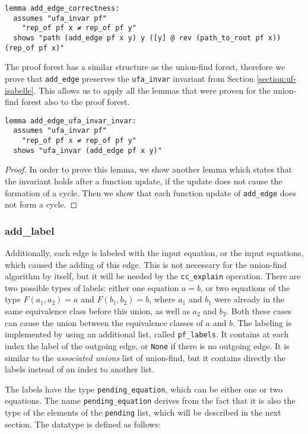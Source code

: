\begin{lstlisting}
lemma add_edge_correctness:
  assumes "ufa_invar pf"
    "rep_of pf x ≠ rep_of pf y"
  shows "path (add_edge pf x y) y ([y] @ rev (path_to_root pf x)) (rep_of pf x)"
\end{lstlisting}

The proof forest has a similar structure as the union-find forest, therefore we prove that \lstinline|add_edge| preserves the \lstinline|ufa_invar| invariant from Section \ref{section:uf-isabelle}. This allows us to apply all the lemmas that were proven for the union-find forest also to the proof forest.

\begin{lstlisting}
lemma add_edge_ufa_invar_invar:
  assumes "ufa_invar pf"
    "rep_of pf x ≠ rep_of pf y"
  shows "ufa_invar (add_edge pf x y)"
\end{lstlisting}

\begin{proof}
In order to prove this lemma, we show another lemma which states that the invariant holds after a function update, if the update does not cause the formation of a cycle. Then we show that each function update of \lstinline|add_edge| does not form a cycle.
\end{proof}

\subsubsection{add\_label}
\label{subsubsection:addlabel}

Additionally, each edge is labeled with the input equation, or the input equations, which caused the adding of this edge. This is not necessary for the union-find algorithm by itself, but it will be needed by the \lstinline|cc_explain| operation.
There are two possible types of labels: either one equation $a = b$, or two equations of the type $F(a_1, a_2) = a$ and $F(b_1, b_2) = b$, where $a_1$ and $b_1$ were already in the same equivalence class before this union, as well as $a_2$ and $b_2$.
Both these cases can cause the union between the equivalence classes of $a$ and $b$.
The labeling is implemented by using an additional list, called \lstinline|pf_labels|.
It contains at each index the label of the outgoing edge, or \lstinline|None| if there is no outgoing edge.
It is similar to the \emph{associated unions} list of union-find, but it contains directly the labels instead of an index to another list.

The labels have the type \lstinline|pending_equation|, which can be either one or two equations. The name \lstinline|pending_equation| derives from the fact that it is also the type of the elements of the \lstinline|pending| list, which will be described in the next section. The datatype is defined as follows:

